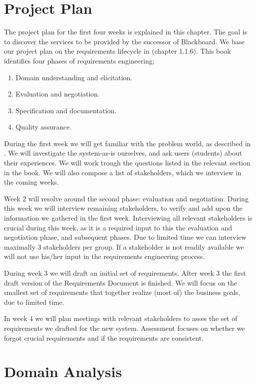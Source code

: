 \chapter{Project Plan}
The project plan for the first four weeks is explained in this chapter. The goal is to discover the services to be provided by the successor of Blackboard. We base our project plan on the requirements lifecycle in \cite{RE_book} (chapter 1.1.6). This book identifies four phases of requirements engineering; 
\begin{enumerate}
	\item Domain understanding and elicitation.
	\item Evaluation and negotiation.
	\item Specification and documentation.
	\item Quality assurance.
\end{enumerate}

During the first week we will get familiar with the problem world, as described in \cite{RE_book}. We will investigate the system-as-is ourselves, and ask users (students) about their experiences. We will work trough the questions listed in the relevant section in the book. We will also compose a list of stakeholders, which we interview in the coming weeks.

Week 2 will resolve around the second phase: evaluation and negotiation. During this week we will interview remaining stakeholders, to verify and add upon the information we gathered in the first week. Interviewing all relevant stakeholders is crucial during this week, as it is a required input to this the evaluation and negotiation phase, and subsequent phases. Due to limited time we can interview maximally 3 stakeholders per group. If a stakeholder is not readily available we will not use his/her input in the requirements engineering process. 

During week 3 we will draft an initial set of requirements. After week 3 the first draft version of the Requirements Document is finished. We will focus on the smallest set of requirements that together realize (most of) the business goals, due to limited time. 

In week 4 we will plan meetings with relevant stakeholders to asses the set of requirements we drafted for the new system. Assessment focuses on whether we forgot crucial requirements and if the requirements are consistent.  

\chapter{Domain Analysis}

